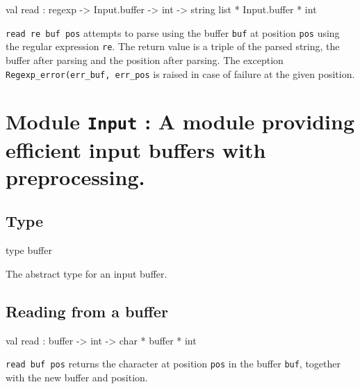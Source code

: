 \documentclass[11pt]{article}
\begin{document}
\label{val:Regexp.read}\begin{ocamldoccode}
val read : regexp -> Input.buffer -> int -> string list * Input.buffer * int
\end{ocamldoccode}
\begin{ocamldocdescription}
{\tt{read re buf pos}} attempts to parse using the buffer {\tt{buf}} at
    position {\tt{pos}} using the regular expression {\tt{re}}. The return value is
    a triple of the parsed string, the buffer after parsing and the
    position after parsing. The exception {\tt{Regexp\_error(err\_buf, err\_pos}}
    is raised in case of failure at the given position.


\end{ocamldocdescription}


\section{Module {\tt{Input}} : A module providing efficient input buffers with preprocessing.}
\label{module:Input}




\ocamldocvspace{0.5cm}



\subsection{Type}




\label{type:Input.buffer}\begin{ocamldoccode}
type buffer 
\end{ocamldoccode}
\begin{ocamldocdescription}
The abstract type for an input buffer.


\end{ocamldocdescription}




\subsection{Reading from a buffer}




\label{val:Input.read}\begin{ocamldoccode}
val read : buffer -> int -> char * buffer * int
\end{ocamldoccode}
\begin{ocamldocdescription}
{\tt{read buf pos}} returns the character at position {\tt{pos}} in the buffer
    {\tt{buf}}, together with the new buffer and position.


\end{ocamldocdescription}
\end{document}
